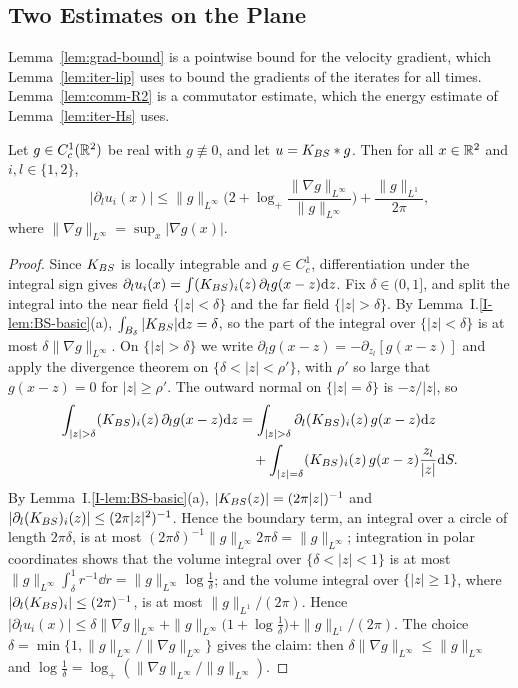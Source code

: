 \subsection{Two Estimates on the Plane}

Lemma~\ref{lem:grad-bound} is a pointwise
bound for the velocity gradient, which Lemma~\ref{lem:iter-lip} uses to bound
the gradients of the iterates for all times. Lemma~\ref{lem:comm-R2} is a
commutator estimate, which the energy estimate of Lemma~\ref{lem:iter-Hs} uses.

\begin{lemma}
\label{lem:grad-bound}
Let $g\in C^1_c(\mathbb{R}^2)$ be real with $g\not\equiv0$, and let $u=K_{BS}\ast g$. Then
for all $x\in\mathbb{R}^2$ and $i,l\in\{1,2\}$,
\[
|\partial_lu_i(x)|\le\|g\|_{L^\infty}\Big(2+\log_+\frac{\|\nabla g\|_{L^\infty}}{\|g\|_{L^\infty}}\Big)
+\frac{\|g\|_{L^1}}{2\pi},
\]
where $\|\nabla g\|_{L^\infty}=\sup_x|\nabla g(x)|$.
\end{lemma}

\begin{proof}
Since $K_{BS}$ is locally integrable and $g\in C^1_c$, differentiation under the
integral sign gives $\partial_lu_i(x)=\int(K_{BS})_i(z)\,\partial_lg(x-z)\dd z$.
Fix $\delta\in(0,1]$, and split the integral into the near field
$\{|z|<\delta\}$ and the far field $\{|z|>\delta\}$. By
Lemma~I.\ref{I-lem:BS-basic}(a), $\int_{B_\delta}|K_{BS}|\dd z=\delta$, so the part of the integral
over $\{|z|<\delta\}$ is at most $\delta\|\nabla g\|_{L^\infty}$. On
$\{|z|>\delta\}$ we write $\partial_lg(x-z)=-\partial_{z_l}[g(x-z)]$ and apply
the divergence theorem on $\{\delta<|z|<\rho'\}$, with $\rho'$ so large that
$g(x-z)=0$ for $|z|\ge\rho'$. The outward normal on $\{|z|=\delta\}$ is
$-z/|z|$, so
\begin{align*}
\int_{|z|>\delta}(\KBS)_i(z)\,\partial_lg(x-z)\dd z
&=\int_{|z|>\delta}\partial_l(\KBS)_i(z)\,g(x-z)\dd z\\
&\quad+\int_{|z|=\delta}(\KBS)_i(z)\,g(x-z)\frac{z_l}{|z|}\dd S .
\end{align*}
By Lemma~I.\ref{I-lem:BS-basic}(a), $|K_{BS}(z)|=(2\pi|z|)^{-1}$ and
$|\partial_l(K_{BS})_i(z)|\le(2\pi|z|^2)^{-1}$. Hence the boundary term, an integral
over a circle of length $2\pi\delta$, is at most
$(2\pi\delta)^{-1}\|g\|_{L^\infty}2\pi\delta=\|g\|_{L^\infty}$; integration in
polar coordinates shows that the volume integral
over $\{\delta<|z|<1\}$ is at most
$\|g\|_{L^\infty}\int_\delta^1r^{-1}\dd r=\|g\|_{L^\infty}\log\frac1\delta$; and the
volume integral over $\{|z|\ge1\}$, where $|\partial_l(K_{BS})_i|\le(2\pi)^{-1}$, is at most $\|g\|_{L^1}/(2\pi)$. Hence
$|\partial_lu_i(x)|\le\delta\|\nabla g\|_{L^\infty}+\|g\|_{L^\infty}\big(1+\log\frac1\delta\big)+\|g\|_{L^1}/(2\pi)$.
The choice $\delta=\min\{1,\|g\|_{L^\infty}/\|\nabla g\|_{L^\infty}\}$ gives the
claim: then $\delta\|\nabla g\|_{L^\infty}\le\|g\|_{L^\infty}$ and
$\log\frac1\delta=\log_+(\|\nabla g\|_{L^\infty}/\|g\|_{L^\infty})$.
\end{proof}


